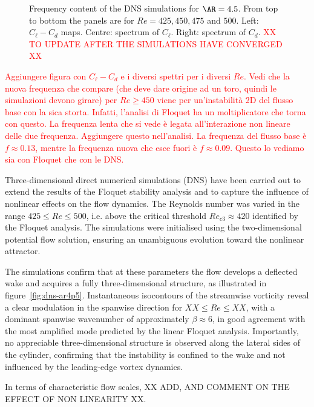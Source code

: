 \begin{figure}
  \caption{Frequency content of the DNS simulations for $\AR=4.5$. From top to bottom the panels are for $Re=425,450,475$ and $500$. Left: $C_\ell-C_d$ maps. Centre: spectrum of $C_\ell$. Right: spectrum of $C_d$. \textcolor{red}{XX TO UPDATE AFTER THE SIMULATIONS HAVE CONVERGED XX}}
  \label{fig:clcddns-ar4p5}
\end{figure} 


\textcolor{red}{Aggiungere figura con $C_\ell-C_d$ e i diversi spettri per i diversi $Re$. Vedi che la nuova frequenza che compare (che deve dare origine ad un toro, quindi le simulazioni devono girare) per $Re \ge 450$ viene per un'instabilità 2D del flusso base con la sica storta. Infatti, l'analisi di Floquet ha un moltiplicatore che torna con questo. La frequenza lenta che si vede è legata all'interazione non lineare delle due frequenza. Aggiungere questo nell'analisi. La frequenza del flusso base è $f \approx 0.13$, mentre la frequenza nuova che esce fuori è $f \approx 0.09$. Questo lo vediamo sia con Floquet che con le DNS.}



Three-dimensional direct numerical simulations (DNS) have been carried out to extend the results of the Floquet stability analysis and to capture the influence of nonlinear effects on the flow dynamics. The Reynolds number was varied in the range $425 \le Re \le 500$, i.e. above the critical threshold $Re_{c3} \approx 420$ identified by the Floquet analysis. The simulations were initialised using the two-dimensional potential flow solution, ensuring an unambiguous evolution toward the nonlinear attractor.

The simulations confirm that at these parameters the flow develops a deflected wake and acquires a fully three-dimensional structure, as illustrated in figure~\ref{fig:dns-ar4p5}. Instantaneous isocontours of the streamwise vorticity reveal a clear modulation in the spanwise direction for $ XX \le Re \le XX $, with a dominant spanwise wavenumber of approximately $\beta \approx 6$, in good agreement with the most amplified mode predicted by the linear Floquet analysis. Importantly, no appreciable three-dimensional structure is observed along the lateral sides of the cylinder, confirming that the instability is confined to the wake and not influenced by the leading-edge vortex dynamics.

In terms of characteristic flow scales, XX ADD, AND COMMENT ON THE EFFECT OF NON LINEARITY XX.


